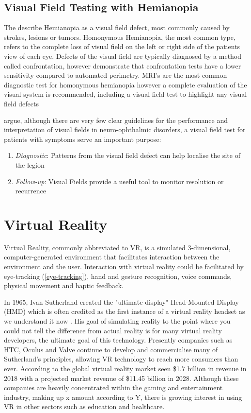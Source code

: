 \documentclass{l4proj}
\begin{document}
\subsection{Visual Field Testing with Hemianopia} \label{background:VFT_Hemianopia}
The \citet{BIOS2016VisualFieldLoss}  describe Hemianopia as a visual field defect, most commonly caused by strokes, lesions or tumors. Homonymous Hemianopia, the most common type, refers to the complete loss of visual field on the left or right side of the patients view of each eye. Defects of the visual field are typically diagnosed by a method called confrontation, however \citet{Pandit2001VisualFields} demonstrate that confrontation tests have a lower sensitivity compared to automated perimetry. MRI's are the most common diagnostic test for homonymous hemianopia however a complete evaluation of the visual system is recommended, including a visual field test to highlight any visual field defects \citep{NANOS2021HomonymousHemianopia}

\citet{Kedar2011VisualFields} argue, although there are very few clear guidelines for the performance and interpretation of visual fields in neuro-ophthalmic disorders, a visual field test for patients with symptoms serve an important purpose:
\begin{enumerate}
\item \textit{Diagnostic}: Patterns from the visual field defect can help localise the site of the legion
\item \textit{Follow-up}: Visual Fields provide a useful tool to monitor resolution or recurrence
\end{enumerate}

\section{Virtual Reality} \label{background:VR}

Virtual Reality, commonly abbreviated to VR, is a simulated 3-dimensional, computer-generated environment that facilitates interaction between the environment and the user. Interaction with virtual reality could be facilitated by eye-tracking (\ref{eye-tracking}), hand and gesture recognition, voice commands, physical movement and haptic feedback.

In 1965, Ivan Sutherland created the "ultimate display" Head-Mounted Display (HMD) which is often credited as the first instance of a virtual reality headset as we understand it now \citep{VRS2017}. His goal of simulating reality to the point where you could not tell the difference from actual reality is for many virtual reality developers, the ultimate goal of this technology. Presently companies such as HTC, Oculus and Valve continue to develop and commercialise many of Sutherland's principles, allowing VR technology to reach more consumers than ever. According to \citet{Alsop2024} the global virtual reality market seen \$1.7 billion in revenue in 2018 with a projected market revenue of \$11.45 billion in 2028. Although these companies are heavily concentrated within the gaming and entertainment industry, making up x amount according to Y, there is growing interest in using VR in other sectors such as education and healthcare.
\end{document}

